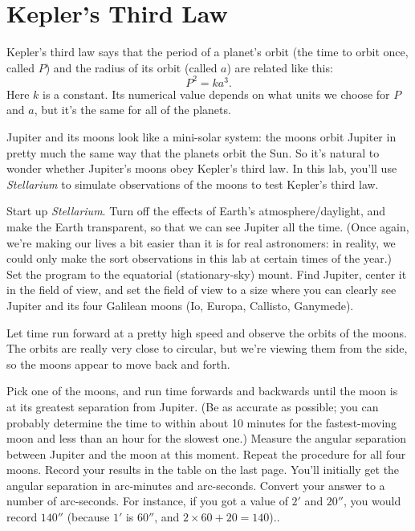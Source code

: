 \section{Kepler's Third Law}

\makelabheader

\answerspace{1in}

Kepler's third law says that the period of a planet's orbit
(the time to orbit once, called $P$) and the radius
of its orbit (called $a$) are related like this:
$$
P^2=ka^3.
$$
Here $k$ is a constant.  Its numerical value depends on what units
we choose for $P$ and $a$, but it's the same for all of the planets.

Jupiter and its moons look like a mini-solar system: the moons orbit
Jupiter in pretty much the same way that the planets orbit the Sun.
So it's natural to wonder whether Jupiter's moons obey Kepler's third
law.  In this lab, you'll use 
{\it Stellarium} to simulate
observations of the moons to test Kepler's third law.

Start up \textit{Stellarium}. Turn off the effects of Earth's
atmosphere/daylight, and make the Earth transparent, so that we can see
Jupiter all the time. (Once again, we're making our lives a bit easier than
it is for real astronomers: in reality, we could only make
the sort observations in this lab at certain times of the year.)
Set the program to the equatorial (stationary-sky) mount.
Find Jupiter, center it in the field
of view, and set the field of view to a size where you can clearly 
see Jupiter and its four Galilean moons (Io, Europa, Callisto, Ganymede).

Let time run forward at a pretty high speed and observe the orbits of 
the moons.  The orbits are really very close to circular, but we're
viewing them from the side, so the moons appear to move back and forth.

Pick one of the moons, and run time forwards and backwards until the
moon is at its greatest separation from Jupiter.  (Be as accurate as
possible; you can probably determine the time to within about 10 minutes
for the fastest-moving moon and less than an hour for the slowest one.)
Measure the angular separation between Jupiter and the moon at this moment.
Repeat the procedure for all four moons.  Record your results in the table
on the last page.  You'll initially get the angular separation
in arc-minutes and arc-seconds.  Convert your answer to a number of 
arc-seconds.  For instance, if you got a value of $2'$ and $20''$, you
would record $140''$ (because $1'$ is $60''$, and $2\times 60+20=140$)..

